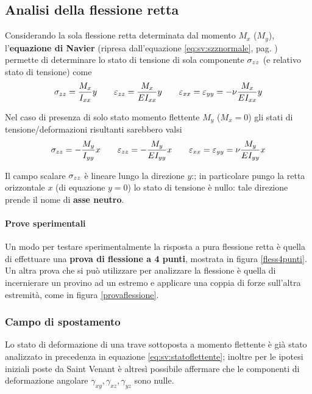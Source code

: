 	\subsection{Analisi della flessione retta}
		\begin{concetto}
			Considerando la sola flessione retta determinata dal momento $M_x$ ($M_y$), l'\textbf{equazione di Navier} (ripresa dall'equazione \ref{eq:sv:szznormale}, pag. \pageref{eq:sv:szznormale}) permette di determinare lo stato di tensione di sola componente $\sigma_{zz}$ (e relativo stato di tensione) come
			\begin{equation} \label{eq:sv:statoflettente}
				\sigma_{zz} = \frac {M_x} {I_{xx}} y \qquad \varepsilon_{zz} = \frac {M_x} {EI_{xx}} y \qquad \varepsilon_{xx} = \varepsilon_{yy} = -\nu \frac {M_x}{EI_{xx}} y
			\end{equation} 
		\end{concetto}
		\begin{osservazione}
			Nel caso di presenza di solo stato momento flettente $M_y$ ($M_x=0$) gli stati di tensione/deformazioni risultanti sarebbero valsi
			\[ \sigma_{zz} = -\frac {M_y} {I_{yy}} x \qquad \varepsilon_{zz} =-\frac {M_y} {EI_{yy}} x \qquad \varepsilon_{xx} = \varepsilon_{yy} = \nu \frac {M_y}{EI_{yy}} x \]
		\end{osservazione}
		\begin{concetto}
			Il campo scalare $\sigma_{zz}$ è lineare lungo la direzione $y$:; in particolare pungo la retta orizzontale $x$ (di equazione $y=0$) lo stato di tensione è nullo: tale direzione prende il nome di \textbf{asse neutro}.
		\end{concetto}
	
		\paragraph{Prove sperimentali} Un modo per testare sperimentalmente la risposta a pura flessione retta è quella di effettuare una \textbf{prova di flessione a 4 punti}, mostrata in figura \ref{fless4punti}. Un altra prova che si può utilizzare per analizzare la flessione è quella di incernierare un provino ad un estremo e applicare una coppia di forze sull'altra estremità, come in figura \ref{provaflessione}.
		
		
	\subsubsection{Campo di spostamento}
		Lo stato di deformazione di una trave sottoposta a momento flettente è già stato analizzato in precedenza in equazione \ref{eq:sv:statoflettente}; inoltre per le ipotesi iniziali poste da Saint Venant è altresì possibile affermare che le componenti di deformazione angolare $\gamma_{xy}, \gamma_{xz},\gamma_{yz}$ sono nulle.
		
